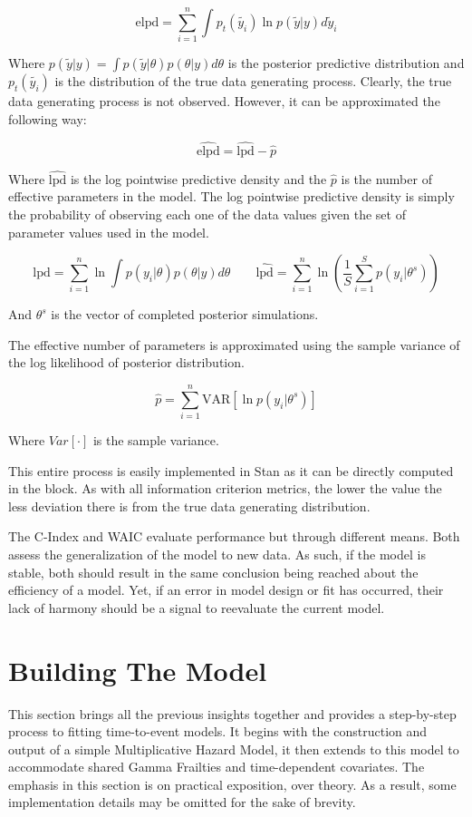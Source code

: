 $$ \text{elpd} = \sum_{i=1}^n \int p_t(\tilde{y_i})\ln p(\tilde{y}|y) d\tilde{y}_i $$

Where $p(\tilde{y}|y) = \int p(\tilde{y}|\theta)p(\theta|y) d\theta$ is the posterior predictive distribution and $p_t(\tilde{y_i})$ is the distribution of the true data generating process. Clearly, the true data generating process is not observed. However, it can be approximated the following way:

$$\hat{\text{elpd}} = \hat{\text{lpd}} - \hat{p}$$

Where $\hat{\text{lpd}}$ is the log pointwise predictive density and the $\hat{p}$ is the number of effective parameters in the model. The log pointwise predictive density is simply the probability of observing each one of the data values given the set of parameter values used in the model.

$$ \text{lpd} = \sum_{i=1}^n \ln \int p(y_i|\theta)p(\theta|y) d\theta \qquad \hat{\text{lpd}} = \sum_{i=1}^n \ln\left ( \frac{1}{S} \sum_{i = 1}^S p(y_i|\theta^s)  \right ) $$

And $\theta^s$ is the vector of completed posterior simulations. 

The effective number of parameters is approximated using the sample variance of the log likelihood of posterior distribution.

$$ \hat{p} = \sum^n_{i=1} \text{VAR}[\ln p(y_i|\theta^s)] $$

Where $Var[\cdot]$ is the sample variance.

This entire process is easily implemented in Stan as it can be directly computed in the  block\cite{Vehtari2014}. As with all information criterion metrics, the lower the value the less deviation there is from the true data generating distribution. 

The C-Index and WAIC evaluate performance but through different means. Both assess the generalization of the model to new data. As such, if the model is stable, both should result in the same conclusion being reached about the efficiency of a model. Yet, if an error in model design or fit has occurred, their lack of harmony should be a signal to reevaluate the current model. 




\section*{Building The Model}

This section brings all the previous insights together and provides a step-by-step process to fitting time-to-event models. It begins with the construction and output of a simple Multiplicative Hazard Model, it then extends to this model to accommodate shared Gamma Frailties and time-dependent covariates. The emphasis in this section is on practical exposition, over theory. As a result, some implementation details may be omitted for the sake of brevity. 

